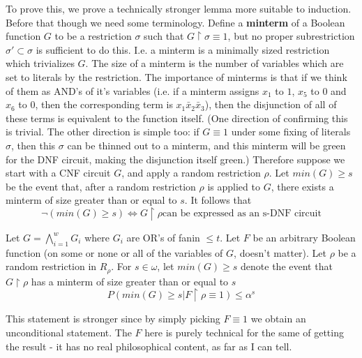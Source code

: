 To prove this, we prove a technically stronger lemma more suitable to induction. Before that though we need some terminology. Define a \textbf{minterm} of a Boolean function $G$ to be a restriction $\sigma$ such that $G \restriction \sigma \equiv 1$, but no proper subrestriction $\sigma' \subset \sigma$ is sufficient to do this. I.e. a minterm is a minimally sized restriction which trivializes $G$. The size of a minterm is the number of variables which are set to literals by the restriction. The importance of minterms is that if we think of them as AND's of it's variables (i.e. if a minterm assigns $x_1$ to $1$, $x_5$ to $0$ and $x_6$ to $0$, then the corresponding term is $x_1\bar{x}_2\bar{x}_3$), then the disjunction of all of these terms is equivalent to the function itself. (One direction of confirming this is trivial. The other direction is simple too: if $G \equiv 1$ under some fixing of literals $\sigma$, then this $\sigma$ can be thinned out to a minterm, and this minterm will be green for the DNF circuit, making the disjunction itself green.) Therefore suppose we start with a CNF circuit $G$, and apply a random restriction $\rho$. Let $min(G) \geq s$ be the event that, after a random restriction $\rho$ is applied to $G$, there exists a minterm of size greater than or equal to $s$. It follows that 
\[ \neg (min(G) \geq s) \iff G \restriction \rho \textrm{can be expressed as an s-DNF circuit}  \] 
\begin{lemma}
	Let $G = \bigwedge_{i=1}^wG_i$ where $G_i$ are OR's of fanin $\leq t$. Let $F$ be an arbitrary Boolean function (on some or none or all of the variables of $G$, doesn't matter). Let $\rho$ be a random restriction in $R_{\rho}$. For $s \in \omega$, let $min(G) \geq s$ denote the event that $G\restriction \rho$ has a minterm of size greater than or equal to $s$
	\[ P(min(G)\geq s|F \restriction \rho \equiv 1) \leq \alpha^s  \]
\end{lemma}
This statement is stronger since by simply picking $F \equiv 1$ we obtain an unconditional statement. The $F$ here is purely technical for the same of getting the result - it has no real philosophical content, as far as I can tell. 
